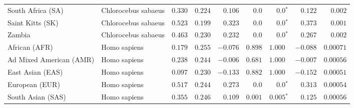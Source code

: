 \begin{center}
\begin{adjustbox}{width = 1\textwidth}
\begin{tabular}{|l|l|r|r|r|r|r|r|r|}
              South Africa (SA) &  Chlorocebus sabaeus &                                        $ 0.330$ &                                           $ 0.224$ &                      $ 0.106$ &            $0.0$ &                  $\bm{0.0{^*}}$ &                                           $ 0.122$ &           $ 0.002$ \\
               Saint Kitts (SK) &  Chlorocebus sabaeus &                                        $ 0.523$ &                                           $ 0.199$ &                      $ 0.323$ &            $0.0$ &                  $\bm{0.0{^*}}$ &                                           $ 0.373$ &           $ 0.001$ \\
                         Zambia &  Chlorocebus sabaeus &                                        $ 0.463$ &                                           $ 0.230$ &                      $ 0.232$ &            $0.0$ &                  $\bm{0.0{^*}}$ &                                           $ 0.267$ &           $ 0.002$ \\
                  African (AFR) &         Homo sapiens &                                        $ 0.179$ &                                           $ 0.255$ &                      $-0.076$ &         $ 0.898$ &                      $ 1.000~~$ &                                           $-0.088$ &          $0.00071$ \\
        Ad Mixed American (AMR) &         Homo sapiens &                                        $ 0.238$ &                                           $ 0.244$ &                      $-0.006$ &         $ 0.681$ &                      $ 1.000~~$ &                                           $-0.007$ &          $0.00056$ \\
               East Asian (EAS) &         Homo sapiens &                                        $ 0.097$ &                                           $ 0.230$ &                      $-0.133$ &         $ 0.882$ &                      $ 1.000~~$ &                                           $-0.152$ &          $0.00051$ \\
                 European (EUR) &         Homo sapiens &                                        $ 0.517$ &                                           $ 0.244$ &                      $ 0.273$ &            $0.0$ &                  $\bm{0.0{^*}}$ &                                           $ 0.313$ &          $0.00054$ \\
              South Asian (SAS) &         Homo sapiens &                                        $ 0.355$ &                                           $ 0.246$ &                      $ 0.109$ &         $ 0.001$ &               $\bm{ 0.005{^*}}$ &                                           $ 0.125$ &          $0.00056$ \\

\end{tabular}
\end{adjustbox}
\end{center}
